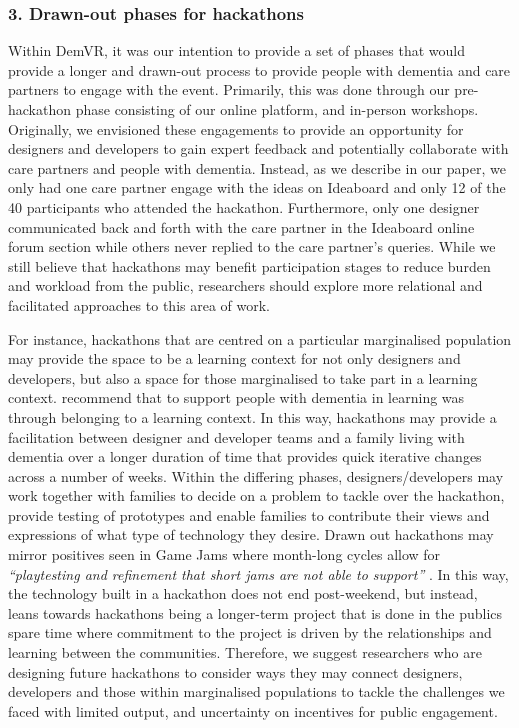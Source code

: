 \subsubsection{3. Drawn-out phases for hackathons}
\label{drawnOut}
Within DemVR, it was our intention to provide a set of phases that would provide a longer and drawn-out process to provide people with dementia and care partners to engage with the event. Primarily, this was done through our pre-hackathon phase consisting of our online platform, and in-person workshops. Originally, we envisioned these engagements to provide an opportunity for designers and developers to gain expert feedback and potentially collaborate with care partners and people with dementia. Instead, as we describe in our paper, we only had one care partner engage with the ideas on Ideaboard and only 12 of the 40 participants who attended the hackathon. Furthermore, only one designer communicated back and forth with the care partner in the Ideaboard online forum section while others never replied to the care partner’s queries. While we still believe that hackathons may benefit participation stages to reduce burden and workload from the public, researchers should explore more relational and facilitated approaches to this area of work. 

For instance, hackathons that are centred on a particular marginalised population may provide the space to be a learning context for not only designers and developers, but also a space for those marginalised to take part in a learning context. \cite{rosenberg2012persons} recommend that to support people with dementia in learning was through belonging to a learning context. In this way, hackathons may provide a facilitation between designer and developer teams and a family living with dementia over a longer duration of time that provides quick iterative changes across a number of weeks. Within the differing phases, designers/developers may work together with families to decide on a problem to tackle over the hackathon, provide testing of prototypes and enable families to contribute their views and expressions of what type of technology they desire. Drawn out hackathons may mirror positives seen in Game Jams where month-long cycles allow for \textit{“playtesting and refinement that short jams are not able to support”} \citep{faas2019jam}. In this way, the technology built in a hackathon does not end post-weekend, but instead, leans towards hackathons being a longer-term project that is done in the publics spare time where commitment to the project is driven by the relationships and learning between the communities. Therefore, we suggest researchers who are designing future hackathons to consider ways they may connect designers, developers and those within marginalised populations to tackle the challenges we faced with limited output, and uncertainty on incentives for public engagement.

